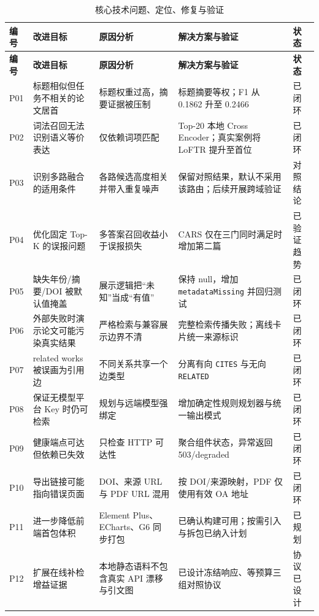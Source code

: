\documentclass[a4paper,11pt,fontset=none]{ctexart}
\begin{document}
\begin{longtable}{C{1.0cm} C{3.0cm} >{\raggedright\arraybackslash}m{3.85cm} >{\raggedright\arraybackslash}m{4.45cm} C{1.6cm}}
\caption{核心技术问题、定位、修复与验证}\label{tab:issues}\\
\toprule
\textbf{编号} & \textbf{改进目标} & \textbf{原因分析} & \textbf{解决方案与验证} & \textbf{状态} \\
\midrule
\endfirsthead
\toprule
\textbf{编号} & \textbf{改进目标} & \textbf{原因分析} & \textbf{解决方案与验证} & \textbf{状态} \\
\midrule
\endhead
P01 & 标题相似但任务不相关的论文居首 & 标题权重过高，摘要证据被压制 & 标题摘要等权；F1 从 0.1862 升至 0.2466 & 已闭环 \\
P02 & 词法召回无法识别语义等价表达 & 仅依赖词项匹配 & Top-20 本地 Cross Encoder；真实案例将 LoFTR 提升至首位 & 已闭环 \\
P03 & 识别多路融合的适用条件 & 各路候选高度相关并带入重复噪声 & 保留对照结果，默认不采用该路由；后续开展跨域验证 & 对照结论 \\
P04 & 优化固定 Top-K 的误报问题 & 多答案召回收益小于误报损失 & CARS 仅在三门同时满足时增加第二篇 & 已验证趋势 \\
P05 & 缺失年份/摘要/DOI 被默认值掩盖 & 展示逻辑把“未知”当成“有值” & 保持 null，增加 \texttt{metadataMissing} 并回归测试 & 已闭环 \\
P06 & 外部失败时演示论文可能污染真实结果 & 严格检索与兼容展示边界不清 & 完整检索传播失败；离线卡片统一来源标识 & 已闭环 \\
P07 & related works 被误画为引用边 & 不同关系共享一个边类型 & 分离有向 \texttt{CITES} 与无向 \texttt{RELATED} & 已闭环 \\
P08 & 保证无模型平台 Key 时仍可检索 & 规划与远端模型强绑定 & 增加确定性规则规划器与统一输出模式 & 已闭环 \\
P09 & 健康端点可达但依赖已失效 & 只检查 HTTP 可达性 & 聚合组件状态，异常返回 503/degraded & 已闭环 \\
P10 & 导出链接可能指向错误页面 & DOI、来源 URL 与 PDF URL 混用 & 按 DOI/来源映射，PDF 仅使用有效 OA 地址 & 已闭环 \\
P11 & 进一步降低前端首包体积 & Element Plus、ECharts、G6 同步打包 & 已确认构建可用；按需引入与拆包已纳入计划 & 已规划 \\
P12 & 扩展在线补检增益证据 & 本地静态语料不包含真实 API 漂移与引文图 & 已设计冻结响应、等预算三组对照协议 & 协议已设计 \\
\bottomrule
\end{longtable}
\end{document}
